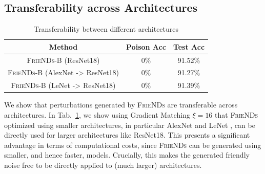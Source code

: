 \documentclass{article}
\newcommand{\alg}{\textsc{FrieNDs}}
\newcommand{\tabref}[1]{Tab.~\ref{#1}}
\begin{document}
\subsection{Transferability across Architectures}
\begin{table}[t]
    \centering
    \caption{Transferability between different architectures}\vspace{-1mm}
    \label{tab:architectures}
    \begin{tabular}{c|cc}
    \toprule
        Method & Poison Acc & Test Acc \\
        \toprule
         \alg-B (ResNet18) & 0\% & 91.52\% \\
         \alg-B (AlexNet -> ResNet18) & 0\% & 91.27\% \\ 
         \alg-B (LeNet -> ResNet18) & 0\% & 91.39\% \\
         \bottomrule
    \end{tabular}\vspace{-3mm}
\end{table}
We show that perturbations generated by \alg{} are transferable across architectures. In \tabref{tab:architectures}, we show using Gradient Matching $\xi=16$ that \alg{} optimized using smaller architectures, in particular AlexNet \citep{krizhevsky2012imagenet} and LeNet \citep{lecun98}, can be directly used for larger architectures like ResNet18. This presents a significant advantage in terms of computational costs, since \alg{} can be generated using smaller, and hence faster, models. Crucially, this makes the generated friendly noise free to be directly applied to (much larger) architectures. 
\end{document}
